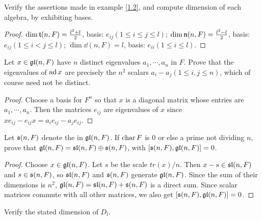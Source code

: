 \begin{ex}
  Verify the assertions made in example \ref{1.2}, and compute dimension of each algebra, by exhibiting bases.
\end{ex}
\begin{proof}
  $\dim \tt(n,F)=\frac{l^2+l}{2}$, basis: $e_{ij} (1\leqslant i\leqslant j\leqslant l)$;
  $\dim \nn(n,F)=\frac{l^2-l}{2}$, basis: $e_{ij} (1\leqslant i< j\leqslant l)$;
  $\dim \dd(n,F)=l$, basis: $e_{ii} (1\leqslant i\leqslant l)$.
\end{proof}

\begin{ex}
  Let $x\in\gl(n,F)$ have $n$ distinct eigenvalues $a_1,\cdots,a_n$ in $F$. Prove that the eigenvalues of $\ad x$ are precisely the $n^2$ scalars $a_i-a_j (1\leqslant i,j\leqslant n)$, which of course need not be distinct.
\end{ex}
\begin{proof}
  Choose a basis for $F^n$ so that $x$ is a diagonal matrix whose entries are $a_1,\cdots,a_n$. Then the matrices $e_{ij}$ are eigenvalues of $x$ since $xe_{ij}-e_{ij}x = a_ie_{ij}-a_je_{ij}$.
\end{proof}

\begin{ex}
  Let $\ss(n,F)$ denote the  in $\gl(n,F)$. If $\Char F$ is $0$ or else a prime not dividing $n$, prove that $\gl(n,F) = \sl(n,F)\oplus \ss(n,F)$, with $[\ss(n,F),\gl(n,F)] = 0$.
\end{ex}
\begin{proof}
  Choose $x\in\gl(n,F)$. Let $s$ be the scale $tr(x)/n$. Then $x-s\in \sl(n,F)$ and $s\in\ss(n,F)$, so $\sl(n,F)$ and $\ss(n,F)$ generate $\gl(n,F)$. Since the sum of their dimensions is $n^2$, $\gl(n,F) = \sl(n,F)+\ss(n,F)$ is a direct sum. Since scalar matrices commute with all other matrices, we also get $[\ss(n,F),\gl(n,F)] = 0$.
\end{proof}

\begin{ex}
  Verify the stated dimension of $D_l$.
\end{ex}

